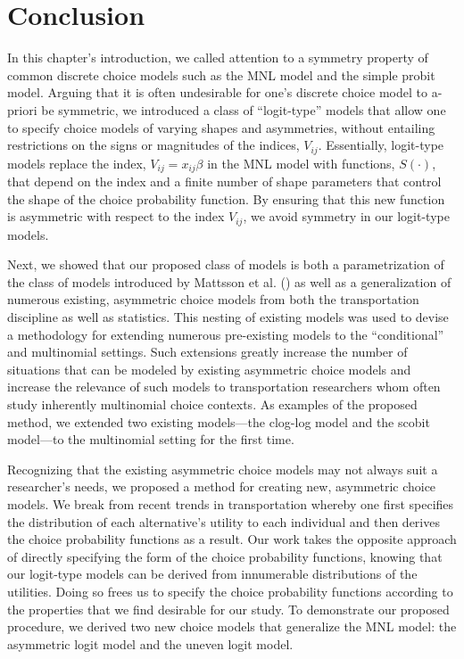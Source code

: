 \section{Conclusion}
\label{sec:conclusion}

In this chapter's introduction, we called attention to a symmetry property of common discrete choice models such as the MNL model and the simple probit model. Arguing that it is often undesirable for one's discrete choice model to a-priori be symmetric, we introduced a class of ``logit-type'' models that allow one to specify choice models of varying shapes and asymmetries, without entailing restrictions on the signs or magnitudes of the indices, $V_{ij}$.  Essentially, logit-type models replace the index, $V_{ij} = x_{ij} \beta$ in the MNL model with functions, $S \left( \cdot \right)$, that depend on the index and a finite number of shape parameters that control the shape of the choice probability function. By ensuring that this new function is asymmetric with respect to the index $V_{ij}$, we avoid symmetry in our logit-type models.

Next, we showed that our proposed class of models is both a parametrization of the class of models introduced by Mattsson et al. (\citeyear{mattsson_extreme_2014}) as well as a generalization of numerous existing, asymmetric choice models from both the transportation discipline as well as statistics. This nesting of existing models was used to devise a methodology for extending numerous pre-existing models to the ``conditional'' and multinomial settings. Such extensions greatly increase the number of situations that can be modeled by existing asymmetric choice models and increase the relevance of such models to transportation researchers whom often study inherently multinomial choice contexts. As examples of the proposed method, we extended two existing models---the clog-log model and the scobit model---to the multinomial setting for the first time.

Recognizing that the existing asymmetric choice models may not always suit a researcher's needs, we proposed a method for creating new, asymmetric choice models. We break from recent trends in transportation whereby one first specifies the distribution of each alternative's utility to each individual and then derives the choice probability functions as a result. Our work takes the opposite approach of directly specifying the form of the choice probability functions, knowing that our logit-type models can be derived from innumerable distributions of the utilities. Doing so frees us to specify the choice probability functions according to the properties that we find desirable for our study. To demonstrate our proposed procedure, we derived two new choice models that generalize the MNL model: the asymmetric logit model and the uneven logit model.

